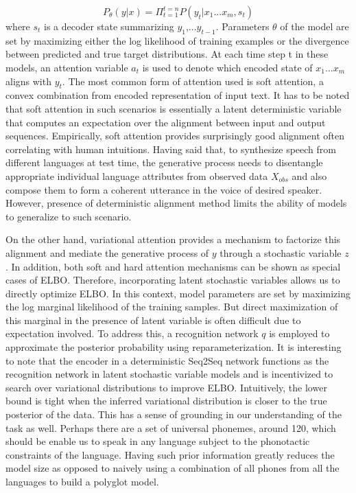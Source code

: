 \begin{equation}
P_\theta(y|x) = \Pi_{ t=1}^{t=n} P(y_t | x_1...x_m,s_t) 
\end{equation} 
where $s_t$ is a decoder state summarizing $y_1$,...$y_{t-1}$. Parameters $\theta$ of the model are set by maximizing either the log likelihood of training examples or the divergence between predicted and true target distributions. At each time step t in these models, an attention variable $a_t$ is used to denote which encoded  state of \textbf{$x_1...x_m$} aligns with \textit{$y_t$}. The most common form of attention used is soft attention, a convex combination from encoded representation of input text. It has to be noted that soft attention in such scenarios is essentially a latent deterministic variable that computes an expectation over the alignment between input and output sequences. Empirically, soft attention provides surprisingly good alignment often  correlating with human intuitions. Having said that, to synthesize speech from different languages at test time, the generative process needs to disentangle appropriate individual language attributes from observed data $X_{obs}$ and also compose them to form a coherent utterance in the voice of desired speaker. However, presence of deterministic alignment method limits the ability of models to generalize to such scenario.


On the other hand, variational attention\citep{latentalignment_variationalattention} provides a mechanism to factorize this alignment and mediate the generative process of $y$ through a stochastic variable $z$. In addition, both soft and hard attention mechanisms can be shown as special cases of ELBO\citep{latentalignment_variationalattention}. Therefore, incorporating latent stochastic variables allows us to directly optimize ELBO. In this context, model parameters are set by maximizing the log marginal likelihood of the training samples. But direct maximization of this marginal in the presence of latent variable  is often difficult due to expectation involved. To address this, a recognition network $q$ is employed to approximate the posterior probability using reparameterization. It is interesting to note that the encoder in a deterministic Seq2Seq network functions as the recognition network in latent stochastic variable models and is incentivized to search over variational distributions to improve ELBO. Intuitively, the lower bound is tight when the inferred variational distribution is closer to the true posterior of the data. This has a sense of grounding in our understanding of the task as well. Perhaps there are a set of universal phonemes, around 120, which should be enable us to speak in any language subject to the phonotactic constraints of the language. Having such prior information greatly reduces the model size as opposed to naively using a combination of all phones from all the languages to build a polyglot model. 


